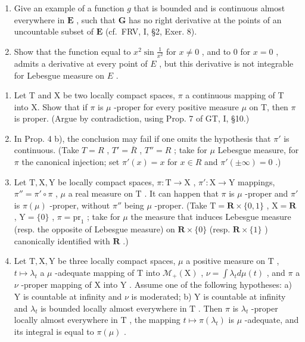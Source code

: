 \begin{enumerate}
\def\labelenumi{\alph{enumi})}
\setcounter{enumi}{1}
\item
  Give an example of a function \(g\) that is bounded and is continuous almost everywhere in \(\mathbf{E}\) , such that \(\mathbf{G}\) has no right derivative at the points of an uncountable subset of \(\mathbf{E}\) (cf.~FRV, I, §2, Exer. 8).
\item
  Show that the function equal to \(x^2 \sin \frac{1}{x^2}\) for \(x \neq 0\) , and to 0 for \(x = 0\) , admits a derivative at every point of \(E\) , but this derivative is not integrable for Lebesgue measure on \(E\) .
\end{enumerate}

\begin{enumerate}
\def\labelenumi{\arabic{enumi})}
\setcounter{enumi}{16}
\item
  Let T and X be two locally compact spaces, \(\pi\) a continuous mapping of T into X. Show that if \(\pi\) is \(\mu\) -proper for every positive measure \(\mu\) on T, then \(\pi\) is proper. (Argue by contradiction, using Prop. 7 of GT, I, §10.)
\item
  In Prop. 4 b), the conclusion may fail if one omits the hypothesis that \(\pi'\) is continuous. (Take \(T = R\) , \(T' = \overline{R}\) , \(T'' = R\) ; take for \(\mu\) Lebesgue measure, for \(\pi\) the canonical injection; set \(\pi'(x) = x\) for \(x \in R\) and \(\pi'(\pm \infty) = 0\) .)
\item
  Let \(\mathrm{T}, \mathrm{X}, \mathrm{Y}\) be locally compact spaces, \(\pi : \mathrm{T} \to \mathrm{X}\) , \(\pi' : \mathrm{X} \to \mathrm{Y}\) mappings, \(\pi'' = \pi' \circ \pi\) , \(\mu\) a real measure on \(\mathrm{T}\) . It can happen that \(\pi\) is \(\mu\) -proper and \(\pi'\) is \(\pi(\mu)\) -proper, without \(\pi''\) being \(\mu\) -proper. (Take \(\mathrm{T} = \mathbf{R} \times \{0, 1\}\) , \(\mathrm{X} = \mathbf{R}\) , \(\mathrm{Y} = \{0\}\) , \(\pi = \mathrm{pr}_1\) ; take for \(\mu\) the measure that induces Lebesgue measure (resp. the opposite of Lebesgue measure) on \(\mathbf{R} \times \{0\}\) (resp. \(\mathbf{R} \times \{1\}\) ) canonically identified with \(\mathbf{R}\) .)
\item
  Let \(\mathrm{T},\mathrm{X},\mathrm{Y}\) be three locally compact spaces, \(\mu\) a positive measure on \(\mathrm{T}\) , \(t\mapsto \lambda_t\) a \(\mu\) -adequate mapping of \(\mathrm{T}\) into \(\mathcal{M}_{+}(\mathrm{X})\) , \(\nu = \int \lambda_t d\mu (t)\) , and \(\pi\) a \(\nu\) -proper mapping of \(\mathrm{X}\) into \(\mathrm{Y}\) . Assume one of the following hypotheses: a) \(\mathrm{Y}\) is countable at infinity and \(\nu\) is moderated; b) \(\mathrm{Y}\) is countable at infinity and \(\lambda_t\) is bounded locally almost everywhere in \(\mathrm{T}\) . Then \(\pi\) is \(\lambda_t\) -proper locally almost everywhere in \(\mathrm{T}\) , the mapping \(t\mapsto \pi (\lambda_t)\) is \(\mu\) -adequate, and its integral is equal to \(\pi (\mu)\) .

\end{enumerate}
